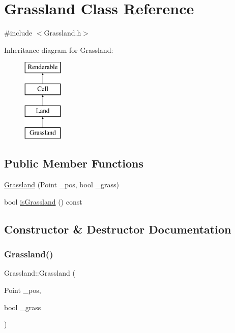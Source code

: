 \hypertarget{classGrassland}{}\section{Grassland Class Reference}
\label{classGrassland}


{\ttfamily \#include $<$Grassland.\+h$>$}

Inheritance diagram for Grassland\+:\begin{figure}[H]
\begin{center}
\leavevmode
\includegraphics[height=4.000000cm]{classGrassland}
\end{center}
\end{figure}
\subsection*{Public Member Functions}
\begin{DoxyCompactItemize}
\item 
\mbox{\hyperlink{classGrassland_a18214ca39f2c443d6dc868f880a7011a}{Grassland}} (Point \+\_\+pos, bool \+\_\+grass)
\item 
bool \mbox{\hyperlink{classGrassland_ac4f00629f20061d2ec9f792a42f7315c}{is\+Grassland}} () const
\end{DoxyCompactItemize}


\subsection{Constructor \& Destructor Documentation}
\mbox{\label{classGrassland_a18214ca39f2c443d6dc868f880a7011a}} 
\subsubsection{\texorpdfstring{Grassland()}{Grassland()}}
{\footnotesize\ttfamily Grassland\+::\+Grassland (\begin{DoxyParamCaption}\item[{Point}]{\+\_\+pos,  }\item[{bool}]{\+\_\+grass }\end{DoxyParamCaption})}



